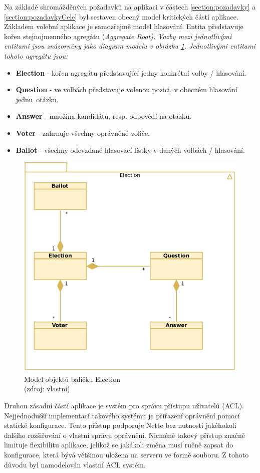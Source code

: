 Na základě shromážděných požadavků na aplikaci v částech \ref{section:pozadavky} a \ref{section:pozadavkyCele} byl sestaven obecný model kritických částí aplikace. Základem volební aplikace je samozřejmě model hlasování. Entita  představuje kořen stejnojmenného agregátu (\it{Aggregate Root}). Vazby mezi jednotlivými entitami jsou znázorněny jako diagram modelu v obrázku \ref{fig:ElectionModel}. Jednotlivými entitami tohoto agregátu jsou: 
\begin{itemize}
	\item \textbf{Election} - kořen agregátu představující jedny konkrétní volby / hlasování.
	\item \textbf{Question} - ve volbách představuje volenou pozici, v obecném hlasování jednu~otázku.
	\item \textbf{Answer} - množina kandidátů, resp. odpovědí na otázku.
	\item \textbf{Voter} - zahrnuje všechny oprávněné voliče.
	\item \textbf{Ballot} - všechny odevzdané hlasovací lístky v daných volbách / hlasování.
\end{itemize}

\begin{figure}[h]
	\centering
	\includegraphics[width=0.6\linewidth]{svg/ElectionModelFull.eps}
	\captionsetup{width=0.6\linewidth}
	\caption[Model objektů balíčku Election]{Model objektů balíčku Election \\(zdroj: vlastní)}
	\label{fig:ElectionModel}
\end{figure}

Druhou zásadní částí aplikace je systém pro správu přístupu uživatelů (ACL). Nejjednodušší implementací takového systému je přiřazení oprávnění pomocí statické konfigurace. Tento přístup podporuje Nette bez nutnosti jakéhokoli dalšího rozšiřování o vlastní správu oprávnění. Nicméně takový přístup značně limituje flexibilitu aplikace, jelikož se jakákoli změna musí ručně zapsat do konfigurace, která bývá většinou uložena na serveru ve formě souboru. Z tohoto důvodu byl namodelován vlastní ACL systém.

